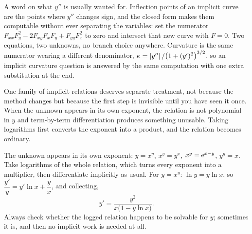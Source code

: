 A word on what $y''$ is usually wanted for. Inflection points of an implicit curve are the points where $y''$ changes sign, and the closed form makes them computable without ever separating the variables: set the numerator $F_{xx}F_{y}^{2}-2F_{xy}F_{x}F_{y}+F_{yy}F_{x}^{2}$ to zero and intersect that new curve with $F=0$. Two equations, two unknowns, no branch choice anywhere. Curvature is the same numerator wearing a different denominator, $\kappa=\left\lvert y''\right\rvert/\bigl(1+(y')^{2}\bigr)^{3/2}$, so an implicit curvature question is answered by the same computation with one extra substitution at the end.

One family of implicit relations deserves separate treatment, not because the method changes but because the first step is invisible until you have seen it once. When the unknown appears in its own exponent, the relation is not polynomial in $y$ and term-by-term differentiation produces something unusable. Taking logarithms first converts the exponent into a product, and the relation becomes ordinary.

\cue The unknown appears in its own exponent: $y=x^{y}$, $x^{y}=y^{x}$, $x^{y}=\mathrm{e}^{x-y}$, $y^{y}=x$.
\method Take logarithms of the whole relation, which turns every exponent into a multiplier, then differentiate implicitly as usual. For $y=x^{y}$: $\ln y=y\ln x$, so $\dfrac{y'}{y}=y'\ln x+\dfrac{y}{x}$, and collecting,
\[
y'=\frac{y^{2}}{x\bigl(1-y\ln x\bigr)} .
\]
Always check whether the logged relation happens to be solvable for $y$; sometimes it is, and then no implicit work is needed at all.

